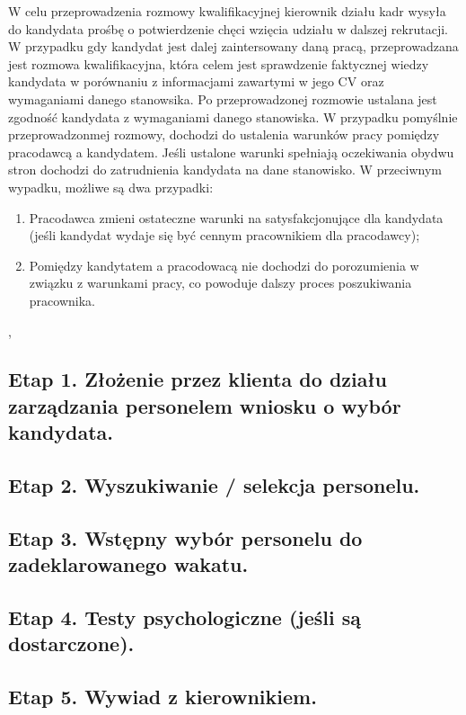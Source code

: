 \documentclass[a4paper, 12pt]{article}
\begin{document}
	\hspace*{1 cm}  W celu przeprowadzenia rozmowy kwalifikacyjnej kierownik działu kadr wysyła do kandydata prośbę o potwierdzenie chęci wzięcia udziału w dalszej rekrutacji. W przypadku gdy kandydat jest dalej zaintersowany daną pracą, przeprowadzana jest rozmowa kwalifikacyjna, która celem jest sprawdzenie faktycznej wiedzy kandydata w porównaniu z informacjami zawartymi w jego CV oraz wymaganiami danego stanowsika. Po przeprowadzonej rozmowie ustalana jest zgodność kandydata z wymaganiami danego stanowiska.\newline
	\hspace*{1 cm} W przypadku pomyślnie przeprowadzonmej rozmowy, dochodzi do ustalenia warunków pracy pomiędzy pracodawcą a kandydatem. Jeśli ustalone warunki spełniają oczekiwania obydwu stron dochodzi do zatrudnienia kandydata na dane stanowisko. W przeciwnym wypadku, możliwe są dwa przypadki: 
	\begin{enumerate}
		\item Pracodawca zmieni ostateczne warunki na satysfakcjonujące dla kandydata (jeśli kandydat wydaje się być cennym pracownikiem dla pracodawcy);
		\item Pomiędzy kandytatem a pracodowacą nie dochodzi do porozumienia w związku z warunkami pracy, co powoduje dalszy proces poszukiwania pracownika.
	\end{enumerate},

\subsection{Etap 1. Złożenie przez klienta do działu zarządzania personelem wniosku o wybór kandydata.}
\subsection{Etap 2. Wyszukiwanie / selekcja personelu.}
\subsection{Etap 3. Wstępny wybór personelu do zadeklarowanego wakatu.}
\subsection{Etap 4. Testy psychologiczne (jeśli są dostarczone).}
\subsection{Etap 5. Wywiad z kierownikiem.}
\end{document}
